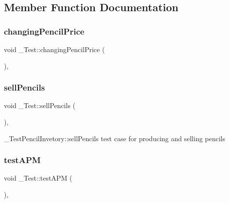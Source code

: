 \subsection{Member Function Documentation}
\mbox{\label{class__Test_a9cabdf9e5c265487d99174166d9206ff}} 
\subsubsection{\texorpdfstring{changingPencilPrice}{changingPencilPrice}}
{\footnotesize\ttfamily void \+\_\+\+Test\+::changing\+Pencil\+Price (\begin{DoxyParamCaption}{ }\end{DoxyParamCaption})\hspace{0.3cm}{\ttfamily [private]}, {\ttfamily [slot]}}

\mbox{\label{class__Test_a92dbc86899cfc80c08981ddcace05b5e}} 
\subsubsection{\texorpdfstring{sellPencils}{sellPencils}}
{\footnotesize\ttfamily void \+\_\+\+Test\+::sell\+Pencils (\begin{DoxyParamCaption}{ }\end{DoxyParamCaption})\hspace{0.3cm}{\ttfamily [private]}, {\ttfamily [slot]}}



\+\_\+\+Test\+Pencil\+Invetory\+::sell\+Pencils test case for producing and selling pencils 

\mbox{\label{class__Test_adb7f71ea12e1b02afd6b4d1f7d65c1eb}} 
\subsubsection{\texorpdfstring{testAPM}{testAPM}}
{\footnotesize\ttfamily void \+\_\+\+Test\+::test\+A\+PM (\begin{DoxyParamCaption}{ }\end{DoxyParamCaption})\hspace{0.3cm}{\ttfamily [private]}, {\ttfamily [slot]}}



